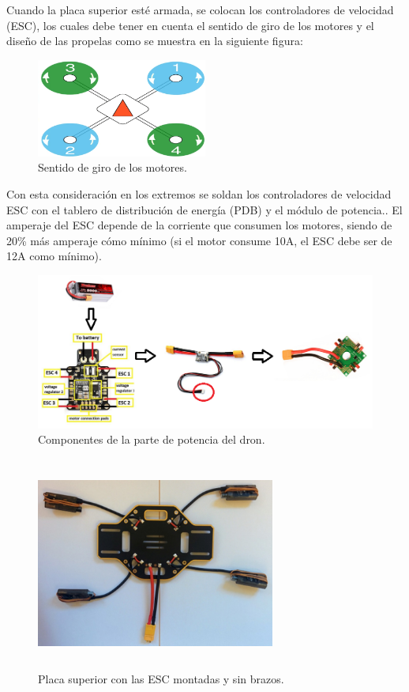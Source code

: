 \noindent Cuando la placa superior esté armada, se colocan los controladores de velocidad (ESC), los cuales debe tener en cuenta el sentido de giro de los motores y el diseño de las propelas como se muestra en la siguiente figura:

\begin{figure}[H]
    \centering
    \includegraphics[width=0.5\textwidth]{imagenes/sentidodegiro.png}
    \caption{Sentido de giro de los motores.}
    \label{fig:basetren}
\end{figure}
\noindent Con esta consideración en los extremos se soldan los controladores de velocidad ESC con el tablero de distribución de energía (PDB) y el módulo de potencia.. El amperaje del ESC depende de la corriente que consumen los motores, siendo de 20\% más amperaje cómo mínimo (si el motor consume 10A, el ESC debe ser de 12A como mínimo).
\begin{figure}[H]
    \centering
    \includegraphics[width=\textwidth]{imagenes/componentes-potencia.png}
    \caption{Componentes de la parte de potencia del dron.}
    \label{fig:basetren}
\end{figure}
\newpage
\begin{figure}[H]
    \centering
    \includegraphics[width=0.7\textwidth, height=7cm]{imagenes/placa-esc.png}
    \caption{Placa superior con las ESC montadas y sin brazos.}
    \label{fig:basetren}
\end{figure}
